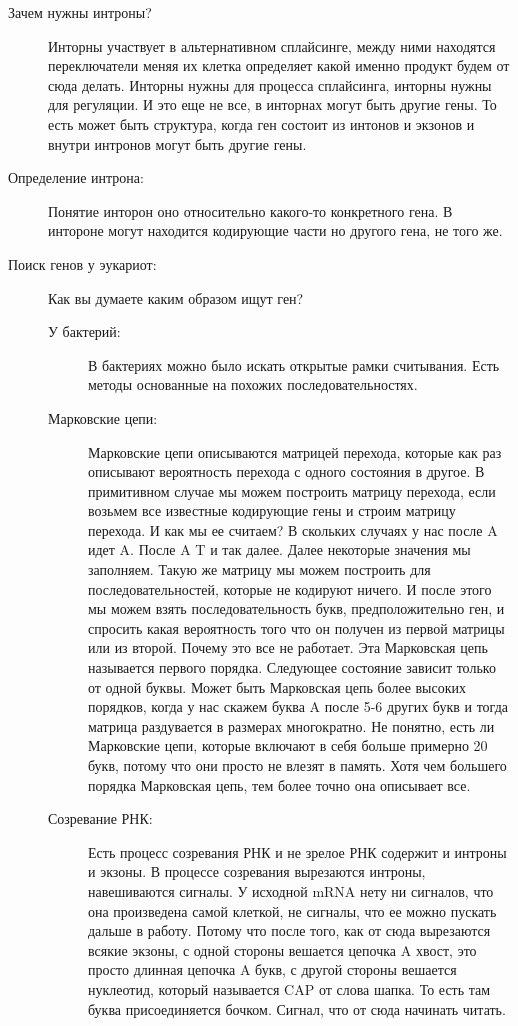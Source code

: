 \begin{description}
\item[Зачем нужны интроны?]
Инторны участвует в альтернативном сплайсинге, между ними 
находятся переключатели меняя их клетка определяет 
какой именно продукт будем от сюда делать. 
Инторны нужны для процесса сплайсинга, инторны нужны для регуляции. 
И это еще не все, в инторнах могут быть другие гены. 
То есть может быть структура, когда ген состоит из интонов и экзонов и внутри интронов 
могут быть другие гены. 

\item[Определение интрона:]
Понятие инторон оно относительно какого-то конкретного гена. В интороне 
могут находится кодирующие части но другого гена, не того же. 


\item[Поиск генов у эукариот:]
Как вы думаете каким образом ищут ген? 
\begin{description}
\item[У бактерий:]
В бактериях можно было искать открытые рамки считывания. Есть 
методы основанные на похожих последовательностях. 

\item[Марковские цепи:]
Марковские цепи описываются матрицей перехода, которые как раз описывают 
вероятность перехода с одного состояния в другое. В примитивном случае 
мы можем построить матрицу перехода, если возьмем все известные кодирующие гены и 
строим матрицу перехода. 
И как мы ее считаем? В скольких случаях у нас после A идет A. После A T и так
далее. Далее некоторые значения мы заполняем. Такую же 
матрицу мы можем построить для последовательностей, которые не кодируют ничего. 
И после этого мы можем взять последовательность 
букв, предположительно ген, и спросить какая 
вероятность того что он получен из первой 
матрицы или из второй. Почему это все не работает. 
Эта Марковская цепь называется первого порядка. 
Следующее состояние зависит только от одной буквы. Может быть 
Марковская цепь более высоких порядков, 
когда у нас скажем буква A после 5-6 других букв и 
тогда матрица раздувается в размерах 
многократно. Не понятно, есть ли 
Марковские цепи, которые включают в себя больше примерно 20 букв, 
потому что они просто не влезят в память. Хотя чем большего 
порядка Марковская цепь, тем 
более точно она описывает все. 

\item[Созревание РНК:]
Есть процесс созревания РНК и не зрелое РНК содержит и интроны и экзоны. 
В процессе созревания 
вырезаются интроны, навешиваются сигналы. У исходной mRNA нету ни 
сигналов, что она произведена самой клеткой, 
не сигналы, что ее можно пускать дальше в работу. Потому что 
после того, как от сюда вырезаются всякие экзоны, с
одной стороны вешается цепочка A хвост, это просто 
длинная цепочка A букв, с другой стороны вешается нуклеотид, 
который называется CAP от слова шапка. То есть 
там буква присоединяется бочком. Сигнал, что от 
сюда начинать читать. 


\end{description}
\end{description}
